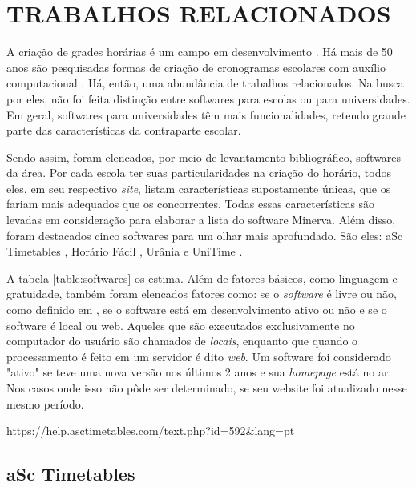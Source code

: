 \documentclass[12pt,a4paper]{article}
\begin{document}
	\section{TRABALHOS RELACIONADOS}

		\par A criação de grades horárias é um campo em desenvolvimento \cite{patat2020}. Há mais de 50 anos são pesquisadas formas de criação de cronogramas escolares com auxílio computacional \cite{appleby}. Há, então, uma abundância de trabalhos relacionados. Na busca por eles, não foi feita distinção entre softwares para escolas ou para universidades. Em geral, softwares para universidades têm mais funcionalidades, retendo grande parte das características da contraparte escolar.

		\par Sendo assim, foram elencados, por meio de levantamento bibliográfico, softwares da área. Por cada escola ter suas particularidades na criação do horário, todos eles, em seu respectivo \textit{site}, listam características supostamente únicas, que os fariam mais adequados que os concorrentes. Todas essas características são levadas em consideração para elaborar a lista do software Minerva. Além disso, foram destacados cinco softwares para um olhar mais aprofundado. São eles: aSc Timetables \cite{rel_asctimetables}, Horário Fácil \cite{rel_horariofacil}, Urânia \cite{rel_urania} e UniTime \cite{rel_unitime}.

		\par A tabela \ref{table:softwares} os estima. Além de fatores básicos, como linguagem e gratuidade, também foram elencados fatores como: se o \textit{software} é livre ou não, como definido em \cite{publico}, se o software está em desenvolvimento ativo ou não e se o software é local ou web. Aqueles que são executados exclusivamente no computador do usuário são chamados de \textit{locais}, enquanto que quando o processamento é feito em um servidor é dito \textit{web}.  Um software foi considerado "ativo" se teve uma nova versão nos últimos 2 anos e sua \textit{homepage} está no ar. Nos casos onde isso não pôde ser determinado, se seu website foi atualizado nesse mesmo período.

		https://help.asctimetables.com/text.php?id=592\&lang=pt

		\subsection{aSc Timetables}
\end{document}
